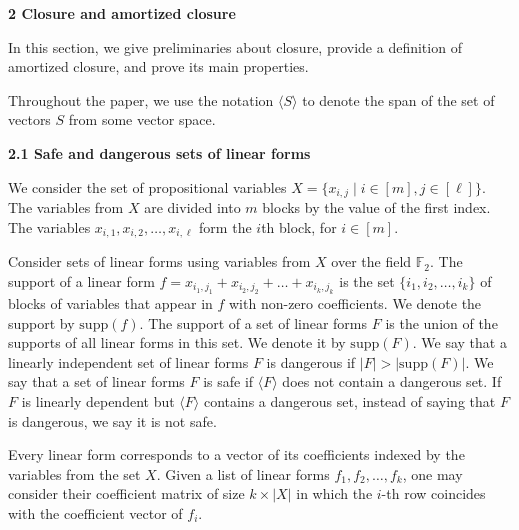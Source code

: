 \documentclass[10pt,a4paper]{article}
\begin{document}
\par\medskip\noindent\textbf{
2 Closure and amortized closure}\par


In this section, we give preliminaries about closure, provide a definition of amortized closure, and prove its main properties.\par



Throughout the paper, we use the notation $\langle S\rangle$ to denote the span of the set of vectors $S$ from some vector space.\par


\par\medskip\noindent\textbf{
2.1 Safe and dangerous sets of linear forms}\par


We consider the set of propositional variables $X=\{x_{i,j}\mid i\in[m],j\in[\ell]\}$. The variables from $X$ are divided into $m$ blocks by the value of the first index. The variables $x_{i,1},x_{i,2},\dots,x_{i,\ell}$ form the $i$th block, for $i\in[m]$.\par



Consider sets of linear forms using variables from $X$ over the field $\mathbb{F}_{2}$.
The support of a linear form $f=x_{i_{1},j_{1}}+x_{i_{2},j_{2}}+\dots+x_{i_{k},j_{k}}$ is the set $\{i_{1},i_{2},\dots,i_{k}\}$ of blocks of variables that appear in $f$ with non-zero coefficients. We denote the support by $\mathrm{supp}(f)$.
The support of a set of linear forms $F$ is the union of the supports of all linear forms in this set. We denote it by $\mathrm{supp}(F)$.
We say that a linearly independent set of linear forms $F$ is dangerous if $|F|>|\mathrm{supp}(F)|$.
We say that a set of linear forms $F$ is safe if $\langle F\rangle$ does not contain a dangerous set.
If $F$ is linearly dependent but $\langle F\rangle$ contains a dangerous set, instead of saying that $F$ is dangerous, we say it is not safe.\par



Every linear form corresponds to a vector of its coefficients indexed by the variables from the set $X$. Given a list of linear forms $f_{1},f_{2},\dots,f_{k}$, one may consider their coefficient matrix of size $k\times|X|$ in which the $i$-th row coincides with the coefficient vector of $f_{i}$.\par
\end{document}
